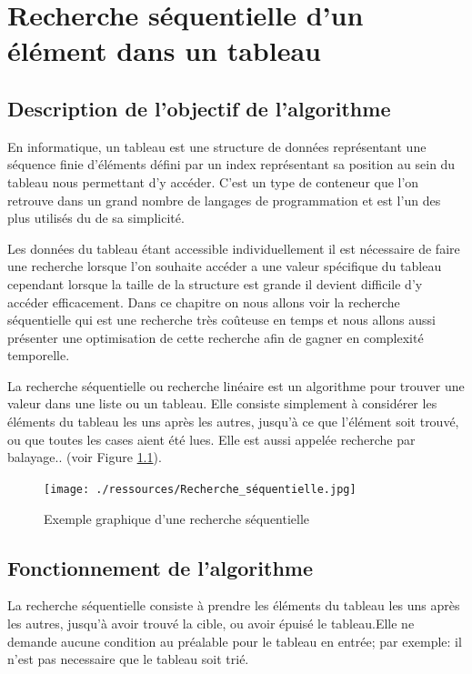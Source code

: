 \chapter{Recherche séquentielle d'un élément dans un tableau}

\section{Description de l'objectif de l'algorithme}
En informatique, un tableau est une structure de données représentant une séquence finie d'éléments défini par un index représentant sa position au sein du tableau nous permettant d'y accéder. C'est un type de conteneur que l'on retrouve dans un grand nombre de langages de programmation et est l'un des plus utilisés du de sa simplicité.
\par
Les données du tableau étant accessible individuellement il est nécessaire de faire une recherche lorsque l'on souhaite accéder a une valeur spécifique du tableau cependant lorsque la taille de la structure est grande il devient difficile d'y accéder efficacement. Dans ce chapitre on nous allons voir la recherche séquentielle qui est une recherche très coûteuse en temps et nous allons aussi présenter une optimisation de cette recherche afin de gagner en complexité temporelle.
\par
La recherche séquentielle ou recherche linéaire est un algorithme pour trouver une valeur dans une liste ou un tableau. Elle consiste simplement à considérer les éléments du tableau les uns après les autres, jusqu'à ce que l'élément soit trouvé, ou que toutes les cases aient été lues. Elle est aussi appelée recherche par balayage.. (voir Figure \ref{fig:recherche_sec}).

\begin{figure}[H]
    \centering
        \texttt{[image: ./ressources/Recherche\_séquentielle.jpg]}
        \caption{Exemple graphique d'une recherche séquentielle}
    \label{fig:recherche_sec}
\end{figure}

\section{Fonctionnement de l'algorithme}
La recherche séquentielle consiste à prendre les éléments du tableau les uns après les autres, jusqu'à avoir trouvé la cible, ou avoir épuisé le tableau.Elle ne demande aucune condition au préalable pour le tableau en entrée; par exemple: il n'est pas necessaire que le tableau soit trié.


